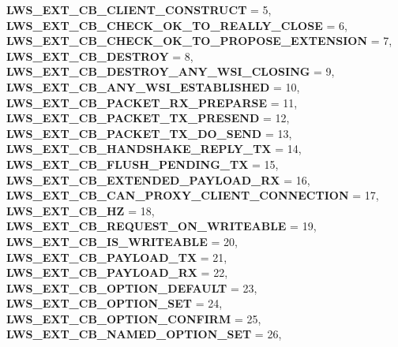 \begin{DoxyCompactItemize}
{\bfseries L\+W\+S\+\_\+\+E\+X\+T\+\_\+\+C\+B\+\_\+\+C\+L\+I\+E\+N\+T\+\_\+\+C\+O\+N\+S\+T\+R\+U\+CT} = 5, 
{\bfseries L\+W\+S\+\_\+\+E\+X\+T\+\_\+\+C\+B\+\_\+\+C\+H\+E\+C\+K\+\_\+\+O\+K\+\_\+\+T\+O\+\_\+\+R\+E\+A\+L\+L\+Y\+\_\+\+C\+L\+O\+SE} = 6, 
{\bfseries L\+W\+S\+\_\+\+E\+X\+T\+\_\+\+C\+B\+\_\+\+C\+H\+E\+C\+K\+\_\+\+O\+K\+\_\+\+T\+O\+\_\+\+P\+R\+O\+P\+O\+S\+E\+\_\+\+E\+X\+T\+E\+N\+S\+I\+ON} = 7, 
\newline
{\bfseries L\+W\+S\+\_\+\+E\+X\+T\+\_\+\+C\+B\+\_\+\+D\+E\+S\+T\+R\+OY} = 8, 
{\bfseries L\+W\+S\+\_\+\+E\+X\+T\+\_\+\+C\+B\+\_\+\+D\+E\+S\+T\+R\+O\+Y\+\_\+\+A\+N\+Y\+\_\+\+W\+S\+I\+\_\+\+C\+L\+O\+S\+I\+NG} = 9, 
{\bfseries L\+W\+S\+\_\+\+E\+X\+T\+\_\+\+C\+B\+\_\+\+A\+N\+Y\+\_\+\+W\+S\+I\+\_\+\+E\+S\+T\+A\+B\+L\+I\+S\+H\+ED} = 10, 
{\bfseries L\+W\+S\+\_\+\+E\+X\+T\+\_\+\+C\+B\+\_\+\+P\+A\+C\+K\+E\+T\+\_\+\+R\+X\+\_\+\+P\+R\+E\+P\+A\+R\+SE} = 11, 
\newline
{\bfseries L\+W\+S\+\_\+\+E\+X\+T\+\_\+\+C\+B\+\_\+\+P\+A\+C\+K\+E\+T\+\_\+\+T\+X\+\_\+\+P\+R\+E\+S\+E\+ND} = 12, 
{\bfseries L\+W\+S\+\_\+\+E\+X\+T\+\_\+\+C\+B\+\_\+\+P\+A\+C\+K\+E\+T\+\_\+\+T\+X\+\_\+\+D\+O\+\_\+\+S\+E\+ND} = 13, 
{\bfseries L\+W\+S\+\_\+\+E\+X\+T\+\_\+\+C\+B\+\_\+\+H\+A\+N\+D\+S\+H\+A\+K\+E\+\_\+\+R\+E\+P\+L\+Y\+\_\+\+TX} = 14, 
{\bfseries L\+W\+S\+\_\+\+E\+X\+T\+\_\+\+C\+B\+\_\+\+F\+L\+U\+S\+H\+\_\+\+P\+E\+N\+D\+I\+N\+G\+\_\+\+TX} = 15, 
\newline
{\bfseries L\+W\+S\+\_\+\+E\+X\+T\+\_\+\+C\+B\+\_\+\+E\+X\+T\+E\+N\+D\+E\+D\+\_\+\+P\+A\+Y\+L\+O\+A\+D\+\_\+\+RX} = 16, 
{\bfseries L\+W\+S\+\_\+\+E\+X\+T\+\_\+\+C\+B\+\_\+\+C\+A\+N\+\_\+\+P\+R\+O\+X\+Y\+\_\+\+C\+L\+I\+E\+N\+T\+\_\+\+C\+O\+N\+N\+E\+C\+T\+I\+ON} = 17, 
{\bfseries L\+W\+S\+\_\+\+E\+X\+T\+\_\+\+C\+B\+\_\+HZ} = 18, 
{\bfseries L\+W\+S\+\_\+\+E\+X\+T\+\_\+\+C\+B\+\_\+\+R\+E\+Q\+U\+E\+S\+T\+\_\+\+O\+N\+\_\+\+W\+R\+I\+T\+E\+A\+B\+LE} = 19, 
\newline
{\bfseries L\+W\+S\+\_\+\+E\+X\+T\+\_\+\+C\+B\+\_\+\+I\+S\+\_\+\+W\+R\+I\+T\+E\+A\+B\+LE} = 20, 
{\bfseries L\+W\+S\+\_\+\+E\+X\+T\+\_\+\+C\+B\+\_\+\+P\+A\+Y\+L\+O\+A\+D\+\_\+\+TX} = 21, 
{\bfseries L\+W\+S\+\_\+\+E\+X\+T\+\_\+\+C\+B\+\_\+\+P\+A\+Y\+L\+O\+A\+D\+\_\+\+RX} = 22, 
{\bfseries L\+W\+S\+\_\+\+E\+X\+T\+\_\+\+C\+B\+\_\+\+O\+P\+T\+I\+O\+N\+\_\+\+D\+E\+F\+A\+U\+LT} = 23, 
\newline
{\bfseries L\+W\+S\+\_\+\+E\+X\+T\+\_\+\+C\+B\+\_\+\+O\+P\+T\+I\+O\+N\+\_\+\+S\+ET} = 24, 
{\bfseries L\+W\+S\+\_\+\+E\+X\+T\+\_\+\+C\+B\+\_\+\+O\+P\+T\+I\+O\+N\+\_\+\+C\+O\+N\+F\+I\+RM} = 25, 
{\bfseries L\+W\+S\+\_\+\+E\+X\+T\+\_\+\+C\+B\+\_\+\+N\+A\+M\+E\+D\+\_\+\+O\+P\+T\+I\+O\+N\+\_\+\+S\+ET} = 26, 

\end{DoxyCompactItemize}
